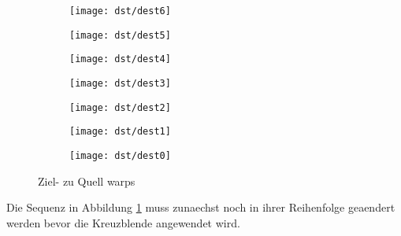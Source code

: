 \begin{figure}[htbp]
	\centering

	    	
	\begin{subfigure}[b]{0.19\textwidth}
		\centering
		\texttt{[image: dst/dest6]} %
		\caption{}
	\end{subfigure}
		\begin{subfigure}[b]{0.19\textwidth}
		\centering
		\texttt{[image: dst/dest5]} %
		\caption{}
	\end{subfigure}
		\begin{subfigure}[b]{0.19\textwidth}
		\centering
		\texttt{[image: dst/dest4]} %
		\caption{}
	\end{subfigure}
		\begin{subfigure}[b]{0.19\textwidth}
		\centering
		\texttt{[image: dst/dest3]} %
		\caption{}
	\end{subfigure}
		\begin{subfigure}[b]{0.19\textwidth}
		\centering
		\texttt{[image: dst/dest2]} %
		\caption{}
	\end{subfigure}
		\begin{subfigure}[b]{0.19\textwidth}
		\centering
		\texttt{[image: dst/dest1]} %
		\caption{}
	\end{subfigure}
		\begin{subfigure}[b]{0.19\textwidth}
		\centering
		\texttt{[image: dst/dest0]} %
		\caption{}
	\end{subfigure}
	
		    
	\caption{Ziel- zu Quell warps}
	\label{fig:destinations}
\end{figure}

Die Sequenz in Abbildung \ref{fig:destinations} muss zunaechst noch
in ihrer Reihenfolge geaendert werden bevor
die Kreuzblende angewendet wird.

